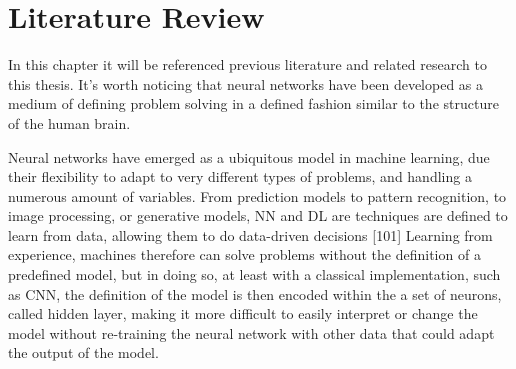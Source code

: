 \chapter{Literature Review} \label{chap:literature}

In this chapter it will be referenced previous literature and related research to this thesis.
It's worth noticing that neural networks have been developed as a medium of defining
problem solving in a defined fashion similar to the structure of the human brain.

Neural networks have emerged as a ubiquitous model in machine learning, due their flexibility 
to adapt to very different types of problems, and handling a numerous amount of variables.
From prediction models to pattern recognition, to image processing, or generative models, NN and DL are
techniques are defined to learn from data, allowing them to do data-driven decisions [101]
Learning from experience, machines therefore can solve problems without the definition
of a predefined model, but in doing so, at least with a classical implementation, such as
CNN, the definition of the model is then encoded within the a set of neurons, called hidden layer,
making it more difficult to easily interpret or change the model without re-training the 
neural network with other data that could adapt the output of the model.